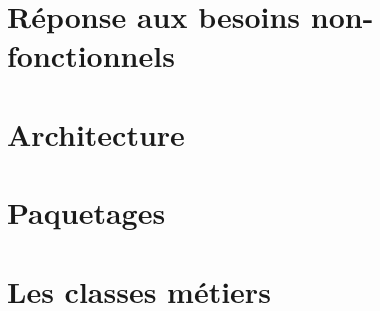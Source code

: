 \section{Réponse aux besoins non-fonctionnels}


\section{Architecture}


\section{Paquetages}


\section{Les classes métiers}
\label{section_metiers}



